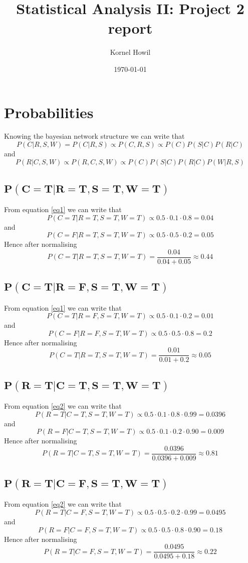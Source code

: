 \documentclass[a4paper,11pt]{article}
\begin{document}
\title{Statistical Analysis II: Project 2 report}

\author{Kornel Howil}

\date{\today}

\maketitle

\section{Probabilities}
Knowing the bayesian network structure we can write that
\begin{equation}
    P(C|R,S,W) = P(C|R,S)\propto P(C, R, S) \propto P(C)P(S|C)P(R|C)
    \label{eq1}
\end{equation}
and
\begin{equation}
    P(R|C,S,W) \propto P(R,C,S,W) \propto P(C)P(S|C)P(R|C)P(W|R,S)
    \label{eq2}
\end{equation}
\subsection{$\mathbf{P(C=T|R=T, S=T, W=T)}$}
From equation \ref{eq1} we can write that
\[
    P(C=T|R=T, S=T, W=T) \propto 0.5 \cdot 0.1 \cdot 0.8 = 0.04
\]
and
\[
    P(C=F|R=T, S=T, W=T) \propto 0.5 \cdot 0.5 \cdot 0.2 = 0.05
\]
Hence after normalising
\[
    P(C=T|R=T, S=T, W=T) = \frac{0.04}{0.04 + 0.05} \approx 0.44
\]
\subsection{$\mathbf{P(C=T|R=F, S=T, W=T)}$}
From equation \ref{eq1} we can write that
\[
    P(C=T|R=F, S=T, W=T) \propto 0.5 \cdot 0.1 \cdot 0.2 = 0.01
\]
and
\[
    P(C=F|R=F, S=T, W=T) \propto 0.5 \cdot 0.5 \cdot 0.8 = 0.2
\]
Hence after normalising
\[
    P(C=T|R=T, S=T, W=T) = \frac{0.01}{0.01 + 0.2} \approx 0.05
\]
\subsection{$\mathbf{P(R=T|C=T, S=T, W=T)}$}
From equation \ref{eq2} we can write that
\[
    P(R=T|C=T, S=T, W=T) \propto 0.5 \cdot 0.1 \cdot 0.8 \cdot 0.99 = 0.0396
\]
and
\[
    P(R=F|C=T, S=T, W=T) \propto 0.5 \cdot 0.1 \cdot 0.2 \cdot 0.90 = 0.009
\]
Hence after normalising
\[
    P(R=T|C=T, S=T, W=T) = \frac{0.0396}{0.0396 + 0.009} \approx 0.81
\]
\subsection{$\mathbf{P(R=T|C=F, S=T, W=T)}$}
From equation \ref{eq2} we can write that
\[
    P(R=T|C=F, S=T, W=T) \propto 0.5 \cdot 0.5 \cdot 0.2 \cdot 0.99 = 0.0495
\]
and
\[
    P(R=F|C=F, S=T, W=T) \propto 0.5 \cdot 0.5 \cdot 0.8 \cdot 0.90 = 0.18
\]
Hence after normalising
\[
    P(R=T|C=F, S=T, W=T) = \frac{0.0495}{0.0495 + 0.18} \approx 0.22
\]
\end{document}
